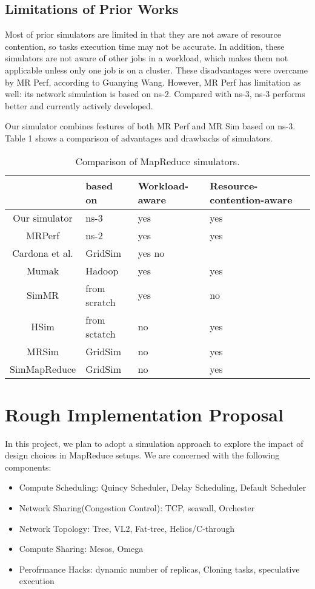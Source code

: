 \documentclass{Project}
\begin{document}
\subsection{Limitations of Prior Works}
Most of prior simulators are limited in that they are not aware of resource contention, so tasks execution time may not be accurate. In addition, these simulators are not aware of other jobs in a workload, which makes them not applicable unless only one job is on a cluster. These disadvantages were overcame by MR Perf, according to Guanying Wang. However, MR Perf has limitation as well: its network simulation is based on ns-2. Compared with ns-3, ns-3 performs better and currently actively developed.\par
Our simulator combines festures of both MR Perf and MR Sim based on ns-3. Table 1 shows a comparison of advantages and drawbacks of simulators.
\begin{table}
\caption{Comparison of MapReduce simulators.}
\begin{tabular}{c|p{}|p{}|p{}p{}}
 \hline
&based on&Workload-aware&Resource-contention-aware\\ \hline
Our simulator & ns-3 & yes &yes\\ \hline
MRPerf & ns-2 & yes &yes\\ \hline
Cardona et al.& GridSim & yes no\\\hline
Mumak & Hadoop & yes & yes\\\hline
SimMR & from scratch & yes & no\\ \hline
HSim & from sctatch & no & yes \\\hline
MRSim & GridSim & no & yes\\\hline
SimMapReduce & GridSim & no & yes\\\hline
\end{tabular}

\end{table}
\section{Rough Implementation Proposal}

In this project, we plan to adopt a simulation approach to explore the impact of design choices in MapReduce setups. We are concerned with the following components:
\begin{itemize}
 \item
 Compute Scheduling: Quincy Scheduler, Delay Scheduling, Default Scheduler
 \item
 Network Sharing(Congestion Control): TCP, seawall, Orchester
 \item
 Network Topology: Tree, VL2, Fat-tree, Helios/C-through
 \item
 Compute Sharing: Mesos, Omega
 \item
 Perofrmance Hacks: dynamic number of replicas, Cloning tasks, speculative execution
\end{itemize}
\end{document}
